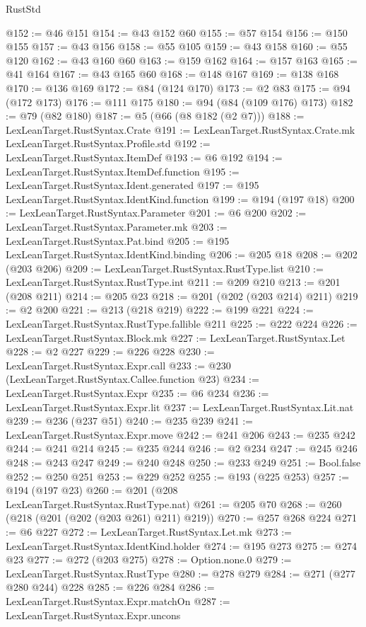 \begin{lexlean}{RustStd}
\begin{coremodule}
@152 := @46 @151
@154 := @43 @152 @60
@155 := @57 @154
@156 := @150 @155
@157 := @43 @156
@158 := @55 @105
@159 := @43 @158
@160 := @55 @120
@162 := @43 @160 @60
@163 := @159 @162
@164 := @157 @163
@165 := @41 @164
@167 := @43 @165 @60
@168 := @148 @167
@169 := @138 @168
@170 := @136 @169
@172 := @84 (@124 @170)
@173 := @2 @83
@175 := @94 (@172 @173)
@176 := @111 @175
@180 := @94 (@84 (@109 @176) @173)
@182 := @79 (@82 @180)
@187 := @5 (@66 (@8 @182 (@2 @7)))
@188 := LexLeanTarget.RustSyntax.Crate
@191 := LexLeanTarget.RustSyntax.Crate.mk LexLeanTarget.RustSyntax.Profile.std
@192 := LexLeanTarget.RustSyntax.ItemDef
@193 := @6 @192
@194 := LexLeanTarget.RustSyntax.ItemDef.function
@195 := LexLeanTarget.RustSyntax.Ident.generated
@197 := @195 LexLeanTarget.RustSyntax.IdentKind.function
@199 := @194 (@197 @18)
@200 := LexLeanTarget.RustSyntax.Parameter
@201 := @6 @200
@202 := LexLeanTarget.RustSyntax.Parameter.mk
@203 := LexLeanTarget.RustSyntax.Pat.bind
@205 := @195 LexLeanTarget.RustSyntax.IdentKind.binding
@206 := @205 @18
@208 := @202 (@203 @206)
@209 := LexLeanTarget.RustSyntax.RustType.list
@210 := LexLeanTarget.RustSyntax.RustType.int
@211 := @209 @210
@213 := @201 (@208 @211)
@214 := @205 @23
@218 := @201 (@202 (@203 @214) @211)
@219 := @2 @200
@221 := @213 (@218 @219)
@222 := @199 @221
@224 := LexLeanTarget.RustSyntax.RustType.fallible @211
@225 := @222 @224
@226 := LexLeanTarget.RustSyntax.Block.mk
@227 := LexLeanTarget.RustSyntax.Let
@228 := @2 @227
@229 := @226 @228
@230 := LexLeanTarget.RustSyntax.Expr.call
@233 := @230 (LexLeanTarget.RustSyntax.Callee.function @23)
@234 := LexLeanTarget.RustSyntax.Expr
@235 := @6 @234
@236 := LexLeanTarget.RustSyntax.Expr.lit
@237 := LexLeanTarget.RustSyntax.Lit.nat
@239 := @236 (@237 @51)
@240 := @235 @239
@241 := LexLeanTarget.RustSyntax.Expr.move
@242 := @241 @206
@243 := @235 @242
@244 := @241 @214
@245 := @235 @244
@246 := @2 @234
@247 := @245 @246
@248 := @243 @247
@249 := @240 @248
@250 := @233 @249
@251 := Bool.false
@252 := @250 @251
@253 := @229 @252
@255 := @193 (@225 @253)
@257 := @194 (@197 @23)
@260 := @201 (@208 LexLeanTarget.RustSyntax.RustType.nat)
@261 := @205 @70
@268 := @260 (@218 (@201 (@202 (@203 @261) @211) @219))
@270 := @257 @268 @224
@271 := @6 @227
@272 := LexLeanTarget.RustSyntax.Let.mk
@273 := LexLeanTarget.RustSyntax.IdentKind.holder
@274 := @195 @273
@275 := @274 @23
@277 := @272 (@203 @275)
@278 := Option.none.{0}
@279 := LexLeanTarget.RustSyntax.RustType
@280 := @278 @279
@284 := @271 (@277 @280 @244) @228
@285 := @226 @284
@286 := LexLeanTarget.RustSyntax.Expr.matchOn
@287 := LexLeanTarget.RustSyntax.Expr.uncons

\end{coremodule}
\end{lexlean}

